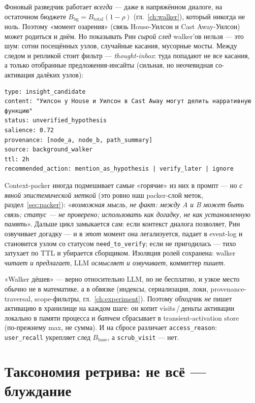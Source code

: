 Фоновый разведчик работает \emph{всегда} — даже в напряжённом диалоге, на остаточном
бюджете $B_{\text{bg}}=B_{\text{total}}(1-\rho)$ (гл.~\ref{ch:walker}), который никогда
не ноль. Поэтому «момент озарения» (связь House-Уилсон и Cast Away-Уилсон) может
родиться и днём. Но показывать Рин \emph{сырой след} walker'ов нельзя — это шум: сотни
посещённых узлов, случайные касания, мусорные мосты. Между следом и репликой стоит
фильтр — \emph{thought-inbox}: туда попадают не все касания, а только отобранные
предложения-инсайты (сильная, но неочевидная со-активация далёких узлов):
\begin{lstlisting}[style=pseudo]
type: insight_candidate
content: "Уилсон у House и Уилсон в Cast Away могут делить нарративную функцию"
status: unverified_hypothesis
salience: 0.72
provenance: [node_a, node_b, path_summary]
source: background_walker
ttl: 2h
recommended_action: mention_as_hypothesis | verify_later | ignore
\end{lstlisting}
Context-packer иногда подмешивает самые «горячие» из них в промпт — но \emph{с явной
эпистемической меткой} (это ровно наш packer-слой меток, раздел~\ref{sec:packer}):
«\emph{возможная мысль, не факт: между A и B может быть связь; статус — не проверено;
использовать как догадку, не как установленную память}». Дальше цикл замыкается сам:
если контекст диалога позволяет, Рин озвучивает догадку — и в \emph{этот} момент она
легализуется, падает в event-log и становится узлом со статусом
\texttt{need\_to\_verify}; если не пригодилась — тихо затухает по TTL и убирается
сборщиком. Изоляция ролей сохранена: walker \emph{читает и предлагает}, LLM
\emph{осмысляет и озвучивает}, коммиттер \emph{пишет}.

\begin{pitfall}
«Walker дёшев» — верно относительно LLM, но не бесплатно, и узкое место обычно не в
математике, а в обвязке (индексы, сериализация, локи, provenance-traversal,
scope-фильтры, гл.~\ref{ch:experiment}). Поэтому обходчик \emph{не} пишет активацию в
хранилище на каждом шаге: он копит visits\,/\,деньты активации локально в памяти
процесса и \emph{батчем} сбрасывает в transient-activation store (по-прежнему max, не
сумма). И на сбросе различает \texttt{access\_reason}: \texttt{user\_recall} укрепляет
след $B_{\text{base}}$, а \texttt{scrub\_visit} — нет.
\end{pitfall}

\section{Таксономия ретрива: не всё — блуждание}
\label{sec:retrievaltax}

